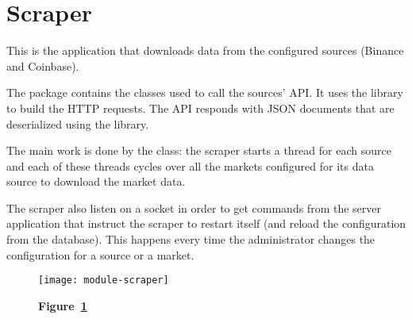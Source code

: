 \section{Scraper}\label{sec:scraper}

This is the application that downloads data from the configured sources (Binance
and Coinbase).

The  package contains the classes used to call the sources' API\@. It
uses the  library to build the HTTP requests. The API responds
with JSON documents that are deserialized using the  library.

The main work is done by the  class: the scraper starts a thread
for each source and each of these threads cycles over all the markets configured
for its data source to download the market data.

The scraper also listen on a socket in order to get commands from the server
application that instruct the scraper to restart itself (and reload the
configuration from the database). This happens every time the administrator
changes the configuration for a source or a market.

\begin{landscape}
	\begin{figure}[!ht]
		\texttt{[image: module-scraper]}
		\caption*{\textbf{Figure~\ref{fig:scraper}}}
		\captionlistentry{}\label{fig:scraper}
	\end{figure}
\end{landscape}

